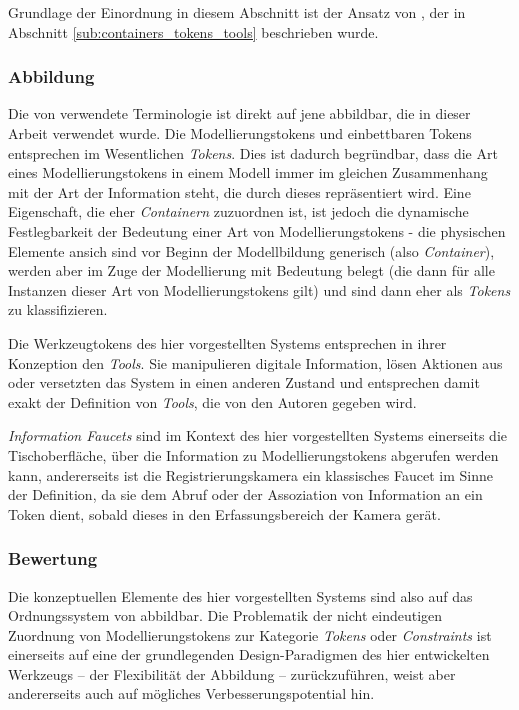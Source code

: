 Grundlage der Einordnung in diesem Abschnitt ist der Ansatz von \citep{Holmquist99}, der in Abschnitt \ref{sub:containers_tokens_tools} beschrieben wurde.

\subsubsection{Abbildung}

Die von \citeauthor{Holmquist99} verwendete Terminologie ist direkt auf jene abbildbar, die in dieser Arbeit verwendet wurde. Die Modellierungstokens und einbettbaren Tokens entsprechen im Wesentlichen \emph{Tokens}. Dies ist dadurch begründbar, dass die Art eines Modellierungstokens in einem Modell immer im gleichen Zusammenhang mit der Art der Information steht, die durch dieses repräsentiert wird. Eine Eigenschaft, die eher \emph{Containern} zuzuordnen ist, ist jedoch die dynamische Festlegbarkeit der Bedeutung einer Art von Modellierungstokens - die physischen Elemente ansich sind vor Beginn der Modellbildung generisch (also \emph{Container}), werden aber im Zuge der Modellierung mit Bedeutung belegt (die dann für alle Instanzen dieser Art von Modellierungstokens gilt) und sind dann eher als \emph{Tokens} zu klassifizieren. 

Die Werkzeugtokens des hier vorgestellten Systems entsprechen in ihrer Konzeption den \emph{Tools}. Sie manipulieren digitale Information, lösen Aktionen aus oder versetzten das System in einen anderen Zustand und entsprechen damit exakt der Definition von \emph{Tools}, die von den Autoren gegeben wird.

\emph{Information Faucets} sind im Kontext des hier vorgestellten Systems einerseits die Tischoberfläche, über die Information zu Modellierungstokens abgerufen werden kann, andererseits ist die Registrierungskamera ein klassisches Faucet im Sinne der Definition, da sie dem Abruf oder der Assoziation von Information an ein Token dient, sobald dieses in den Erfassungsbereich der Kamera gerät.

\subsubsection{Bewertung}

Die konzeptuellen Elemente des hier vorgestellten Systems sind also auf das Ordnungssystem von \citet{Holmquist99} abbildbar. Die Problematik der nicht eindeutigen Zuordnung von Modellierungstokens zur Kategorie \emph{Tokens} oder \emph{Constraints} ist einerseits auf eine der grundlegenden Design-Paradigmen des hier entwickelten Werkzeugs -- der Flexibilität der Abbildung -- zurückzuführen, weist aber andererseits auch auf mögliches Verbesserungspotential hin.

